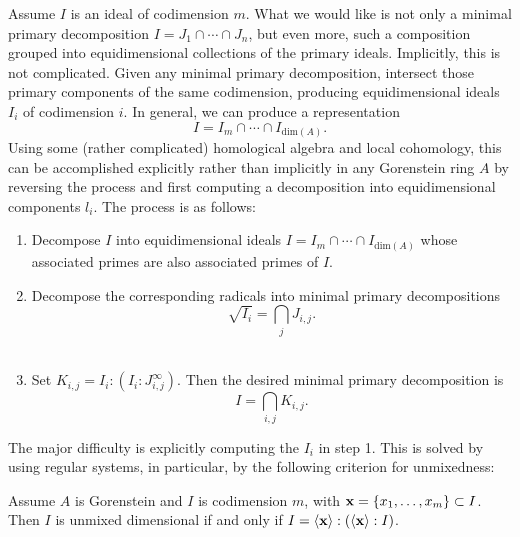 \documentclass[12pt]{article}
\begin{document}
\begin{remark}
Assume $I$ is an ideal of codimension $m$.  What we would like is not only a minimal primary decomposition $I=J_1\cap\cdots\cap J_n$, but even more, such a composition grouped into equidimensional collections of the primary ideals.  Implicitly, this is not complicated.  Given any minimal primary decomposition, intersect those primary components of the same codimension, producing equidimensional ideals $I_i$ of codimension $i$.  In general, we can produce a representation 
\[
I=I_m\cap\cdots\cap I_{\text{dim}(A)}.
\]   
Using some (rather complicated) homological algebra and local cohomology, this can be accomplished explicitly rather than implicitly in any Gorenstein ring $A$ by reversing the process and first computing a decomposition into equidimensional components $l_i$.  The process is as follows:
\begin{enumerate}
\item Decompose $I$ into equidimensional ideals $I=I_m\cap\cdots\cap I_{\text{dim}(A)}$ whose associated primes are also associated primes of $I$.\\
\item Decompose the corresponding radicals into minimal primary decompositions 
\[
\sqrt{I_i} = \bigcap_j J_{i,j}.
\]\\
\item Set $K_{i,j}=I_i:(I_i:J_{i,j}^\infty)$.  Then the desired minimal primary decomposition is 
\[
I=\bigcap_{i,j}K_{i,j}.
\]
\end{enumerate}
The major difficulty is explicitly computing the $I_i$ in step 1.  This is solved by using regular systems, in particular, by the following criterion for unmixedness:

\begin{proposition}
Assume $A$ is Gorenstein and $I$ is codimension $m$, with ${\bf{x}}=\left\{ x_1,\ldots,x_m \right\}\subset I$.  Then $I$ is unmixed dimensional if and only if $I=\left<\bf{x}\right>:( \left<\bf{x}\right>:I)$.
\end{proposition}

\end{remark}
\end{document}
